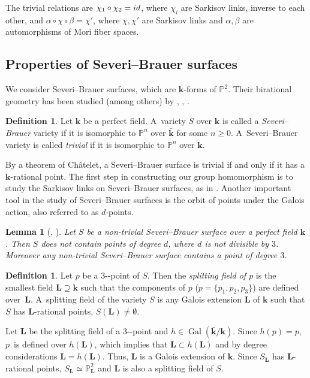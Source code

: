 \documentclass[10pt,a4paper]{amsart}
\providecommand{\nobreakdash}{\nobreak\hbox{-}}
\newcommand{\id}{\textup{id}}
\DeclareMathOperator{\Gal}{Gal}
\newtheorem{lemma}[theorem]{Lemma}
\theoremstyle{definition}
\newtheorem{definition}[theorem]{Definition}
\newcommand{\kk}{{\boldsymbol{k}}}
\newcommand{\LL}{{\boldsymbol{L}}}
\begin{document}
The trivial relations are $\chi_1 \circ \chi_2 = \id$, where $\chi_i$ are Sarkisov links, inverse to each other, and $\alpha \circ \chi \circ \beta = \chi'$, where $\chi, \chi'$ are Sarkisov links and $\alpha, \beta $ are automorphisms of Mori fiber spaces.
\subsection{Properties of Severi--Brauer surfaces}
We consider Severi--Brauer surfaces, which are $\kk$-forms of $\mathbb{P}^2$. Their birational geometry has been studied (among others) by \cite{BSY}, \cite{zbMATH07206468}, \cite{cm:9040}.

\begin{definition}
Let $\kk$ be a perfect field. A~variety $S$ over $\kk$ is called a \emph{Severi--Brauer} variety if it is isomorphic to $\mathbb{P}^n$ over $\bar{\kk}$ for some $n \geq 0$. A~Severi--Brauer variety is called \emph{trivial} if it is isomorphic to $\mathbb{P}^n$ over $\kk$.
\end{definition}
By a theorem of Châtelet, a Severi--Brauer surface is trivial if and only if it has a $\kk$-rational point.
The first step in constructing our group homomorphism is to study the Sarkisov links on Severi--Brauer surfaces, as in \cite{BSY}. Another important tool in the study of Severi--Brauer surfaces is the orbit of points under the Galois action, also referred to as $d$-points.

\begin{lemma}[{\cite[Cor.\,2.2.2 with $p=3$]{BSY}}, {\cite{kollár2025severibrauervarietiesgeometrictreatment}}]
Let $S$ be a non-trivial Severi--Brauer surface over a perfect field $\kk$. Then $S$ does not contain points of degree $d$, where $d$ is not divisible by $3$. Moreover any non-trivial Severi--Brauer surface contains a point of degree $3$.
\end{lemma}

\begin{definition}
Let $p$ be a $3$\nobreakdash-point of $S$. Then the \emph{splitting field of $p$} is the smallest field $\LL \supseteq \kk$ such that the components of $p$ ($p = \{ p_1, p_2, p_3 \}$) are defined over~$\LL$. A~splitting field of the variety $S$ is any Galois extension $\LL$ of $\kk$ such that $S$ has $\LL$-rational points, $S(\LL) \neq \emptyset$.
\end{definition}

Let $\LL$ be the splitting field of a $3$\nobreakdash-point and $h \in \Gal(\bar{\kk}/\kk)$. Since $h(p) = p$, $p$~is defined over $h(\LL)$, which implies that $\LL \subset h(\LL)$ and by degree considerations $\LL = h(\LL)$. Thus, $\LL$ is a Galois extension of $\kk$. Since $S_{\LL}$ has $\LL$-rational points, $S_{\LL} \simeq \mathbb{P}^2_{\LL}$ and $\LL$ is also a splitting field of $S$.
\end{document}
